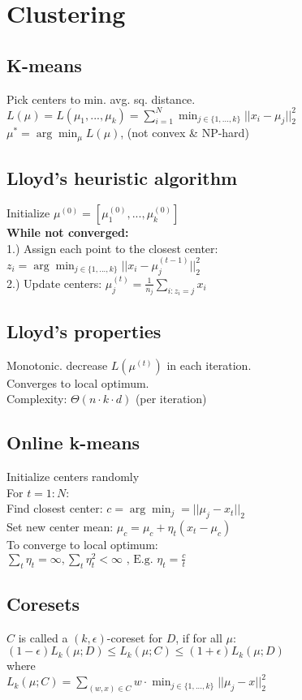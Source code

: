 \section{Clustering}
\subsection*{K-means}
Pick centers to min. avg. sq. distance.\\
$L(\mu) = \displaystyle L (\mu_1,...,\mu_k) = \sum_{i=1}^N \min_{j \in \{1,...,k\}} ||x_i - \mu_j||_2^2$\\
$\mu^* = \arg \min_\mu L(\mu)$, (not convex \& NP-hard)

\subsection*{Lloyd's heuristic algorithm}
Initialize $\mu^{(0)} = [\mu_1^{(0)},...,\mu_k^{(0)}]$\\
\textbf{While not converged:}\\
1.) Assign each point to the closest center:\\
$z_i = \displaystyle \arg \min_{j\in \{1,...,k\}} ||x_i - \mu_j^{(t-1)}||_2^2$\\
2.) Update centers: $\mu_j^{(t)} = \frac{1}{n_j} \displaystyle \sum_{i:z_i=j} x_i$

\subsection*{Lloyd's properties}
Monotonic. decrease $L(\mu^{(t)})$ in each iteration.\\
Converges to local optimum.\\
Complexity: $\Theta ( n \cdot k \cdot d)$ (per iteration)

\subsection*{Online k-means}
Initialize centers randomly\\
For $t=1:N$:\\
Find closest center: $c = \arg \min_j = ||\mu_j-x_t||_2$\\
Set new center mean: $\mu_c = \mu_c + \eta_t(x_t-\mu_c)$\\
To converge to local optimum:\\
$\sum_t \eta_t=\infty, \sum_t\eta_t^2<\infty\text{ , E.g. } \eta_t = \frac{c}{t}$

\subsection*{Coresets}
$C$ is called a $(k, \epsilon)$-coreset for $D$, if for all $\mu:$\\
$(1-\epsilon) L_k(\mu;D) \leq L_k(\mu;C) \leq (1+\epsilon) L_k(\mu;D)$\\
where\\
$\textbf{}L_k(\mu;C) = \sum_{(w,x)\in C} w \cdot \min_{j \in \{1,...,k\}} ||\mu_j-x||_2^2$


